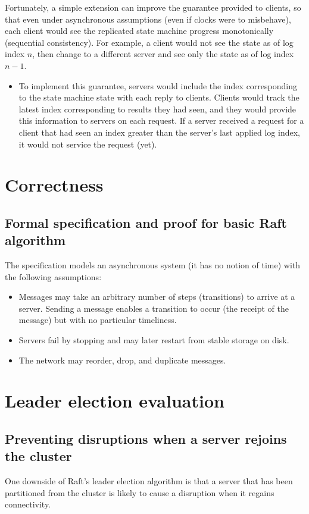 \documentclass[11pt]{article}
\begin{document}
Fortunately, a simple extension can improve the guarantee provided to clients, so that even under
asynchronous assumptions (even if clocks were to misbehave), each client would see the replicated
state machine progress monotonically (sequential consistency). For example, a client would not
see the state as of log index \(n\), then change to a different server and see only the state as of log
index \(n-1\).
\begin{itemize}
\item To implement this guarantee, servers would include the index corresponding to the state machine
state with each reply to clients. Clients would track the latest index corresponding to results they
had seen, and they would provide this information to servers on each request. If a server received a
request for a client that had seen an index greater than the server’s last applied log index, it
would not service the request (yet).
\end{itemize}
\section{Correctness}
\label{sec:orgdabc022}
\subsection{Formal specification and proof for basic Raft algorithm}
\label{sec:orgaaa39ed}
The specification models an asynchronous system (it has no notion of time) with the following assumptions:
\begin{itemize}
\item Messages may take an arbitrary number of steps (transitions) to arrive at a server. Sending a
message enables a transition to occur (the receipt of the message) but with no particular timeliness.
\item Servers fail by stopping and may later restart from stable storage on disk.
\item The network may reorder, drop, and duplicate messages.
\end{itemize}
\section{Leader election evaluation}
\label{sec:orgf9ff11f}
\subsection{Preventing disruptions when a server rejoins the cluster}
\label{sec:org1d0cb4d}
One downside of Raft’s leader election algorithm is that a server that has been partitioned from the
cluster is likely to cause a disruption when it regains connectivity.
\end{document}
